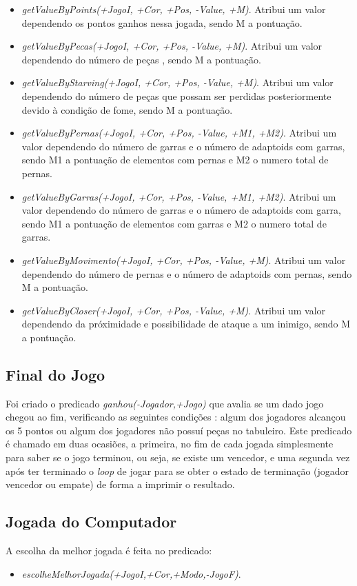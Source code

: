 \documentclass[a4paper]{article}
\begin{document}
\begin{itemize}
    \item \textit{getValueByPoints(+JogoI, +Cor, +Pos, -Value, +M)}. Atribui um valor dependendo os pontos ganhos nessa jogada, sendo M a pontuação.
    \item \textit{getValueByPecas(+JogoI, +Cor, +Pos, -Value, +M)}. Atribui um valor dependendo do número de peças , sendo M a pontuação.
    \item \textit{getValueByStarving(+JogoI, +Cor, +Pos, -Value, +M)}. Atribui um valor dependendo do número de peças que possam ser perdidas posteriormente devido à condição de fome, sendo M a pontuação.
    \item \textit{getValueByPernas(+JogoI, +Cor, +Pos, -Value, +M1, +M2)}. Atribui um valor dependendo do número de garras e o número de adaptoids com garras, sendo M1 a pontuação de elementos com pernas e M2 o numero total de pernas.
    \item \textit{getValueByGarras(+JogoI, +Cor, +Pos, -Value, +M1, +M2)}. Atribui um valor dependendo do número de garras e o número de adaptoids com garra, sendo M1 a pontuação de elementos com garras e M2 o numero total de garras.
    \item \textit{getValueByMovimento(+JogoI, +Cor, +Pos, -Value, +M)}. Atribui um valor dependendo do número de pernas e o número de adaptoids com pernas, sendo M a pontuação.
    \item \textit{getValueByCloser(+JogoI, +Cor, +Pos, -Value, +M)}. Atribui um valor dependendo da próximidade e possibilidade de ataque a um inimigo, sendo M a pontuação.
\end{itemize}

\subsection{Final do Jogo} Foi criado o predicado \textit{ganhou(-Jogador,+Jogo)} que avalia se um dado jogo chegou ao fim, verificando as seguintes condições : algum dos jogadores alcançou os 5 pontos ou algum dos jogadores não possuí peças no tabuleiro. Este predicado é chamado em duas ocasiões, a primeira, no fim de cada jogada simplesmente para saber se o jogo terminou, ou seja, se existe um vencedor, e uma segunda vez após ter terminado o \textit{loop} de jogar para se obter o estado de terminação (jogador vencedor ou empate) de forma a imprimir o resultado.

\subsection{Jogada do Computador}
A escolha da melhor jogada é feita no predicado:
\begin{itemize}
	\item \textit{escolheMelhorJogada(+JogoI,+Cor,+Modo,-JogoF)}.
\end{itemize}
\end{document}
